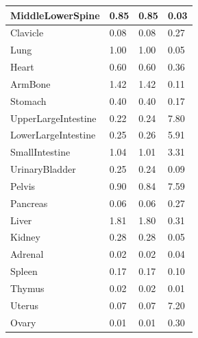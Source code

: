 \documentclass[letterpaper,12pt]{article}
\begin{document}
\begin{table}[H]
\begin{tabular}{llll}
MiddleLowerSpine     & 0.85                   & 0.85              & 0.03                   \\ \hline
Clavicle             & 0.08                   & 0.08              & 0.27                   \\ \hline
Lung                 & 1.00                   & 1.00              & 0.05                   \\ \hline
Heart                & 0.60                   & 0.60              & 0.36                   \\ \hline
ArmBone              & 1.42                   & 1.42              & 0.11                   \\ \hline
Stomach              & 0.40                   & 0.40              & 0.17                   \\ \hline
UpperLargeIntestine  & 0.22                   & 0.24              & 7.80                   \\ \hline
LowerLargeIntestine  & 0.25                   & 0.26              & 5.91                   \\ \hline
SmallIntestine       & 1.04                   & 1.01              & 3.31                   \\ \hline
UrinaryBladder       & 0.25                   & 0.24              & 0.09                   \\ \hline
Pelvis               & 0.90                   & 0.84              & 7.59                   \\ \hline
Pancreas             & 0.06                   & 0.06              & 0.27                   \\ \hline
Liver                & 1.81                   & 1.80              & 0.31                   \\ \hline
Kidney               & 0.28                   & 0.28              & 0.05                   \\ \hline
Adrenal              & 0.02                   & 0.02              & 0.04                   \\ \hline
Spleen               & 0.17                   & 0.17              & 0.10                   \\ \hline
Thymus               & 0.02                   & 0.02              & 0.01                   \\ \hline
Uterus               & 0.07                   & 0.07              & 7.20                   \\ \hline
Ovary                & 0.01                   & 0.01              & 0.30                   \\ \hline
\end{tabular}
\label{RegionMassRefComp}
\end{table}
\end{document}
